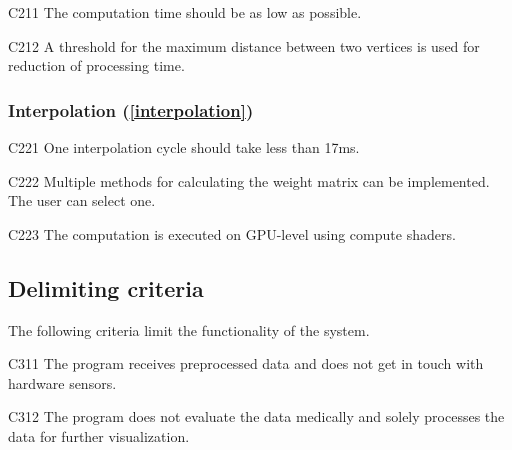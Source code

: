 	\begin{aims}
		
		\item[C211] The computation time should be as low as possible.
		\item[C212] A threshold for the maximum distance between two vertices is used for reduction of processing time.
		
	\end{aims}
	
\subsubsection[Interpolation]{Interpolation (\ref{interpolation})}

	\begin{aims}
	
		\item[C221] One interpolation cycle should take less than 17ms.
		\item[C222] Multiple methods for calculating the weight matrix can be implemented. The user can select one.
		\item[C223] The computation is executed on GPU-level using compute shaders.
	
	\end{aims}
	
	
\subsection{Delimiting criteria} %
	
	The following criteria limit the functionality of the system.
	
	\begin{aims}
		
		\item[C311] The program receives preprocessed data and does not get in touch with hardware sensors.
		\item[C312] The program does not evaluate the data medically and solely processes the data for further 										visualization. 						
		
	\end{aims}
	



	
